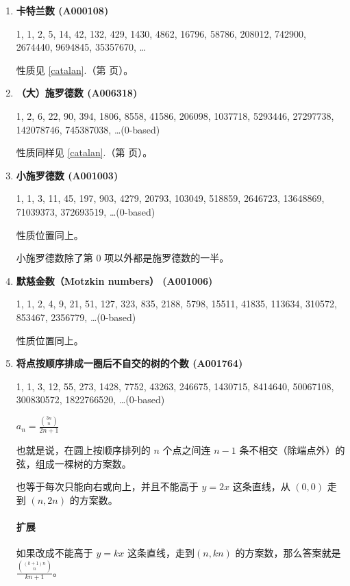 \documentclass[a4paper, twoside]{article}
\newcommand\detailedref[1]{\ref{#1}.\nameref{#1}（第 \pageref{#1} 页）}
\begin{document}
    \begin{enumerate}

        \item \textbf{卡特兰数 (A000108)}

        1, 1, 2, 5, 14, 42, 132, 429, 1430, 4862, 16796, 58786, 208012, 742900, 2674440, 9694845, 35357670, \dots

        性质见 \detailedref{catalan}。 

        \item \textbf{（大）施罗德数 (A006318)}

        1, 2, 6, 22, 90, 394, 1806, 8558, 41586, 206098, 1037718, 5293446, 27297738, 142078746, 745387038, \dots \;(0-based)

        性质同样见 \detailedref{catalan}。

        \item \textbf{小施罗德数 (A001003)}

        1, 1, 3, 11, 45, 197, 903, 4279, 20793, 103049, 518859, 2646723, 13648869, 71039373, 372693519, \dots \;(0-based)

        性质位置同上。

        小施罗德数除了第 $0$ 项以外都是施罗德数的一半。

        \item \textbf{默慈金数（Motzkin numbers） (A001006)}

        1, 1, 2, 4, 9, 21, 51, 127, 323, 835, 2188, 5798, 15511, 41835, 113634, 310572, 853467, 2356779, \dots \;(0-based)

        性质位置同上。

        \item \textbf{将点按顺序排成一圈后不自交的树的个数 (A001764)}

        1, 1, 3, 12, 55, 273, 1428, 7752, 43263, 246675, 1430715, 8414640, 50067108, 300830572, 1822766520, \dots \;(0-based)

        $ a_n = \frac {{3n \choose n}} {2n + 1} $

        也就是说，在圆上按顺序排列的 $n$ 个点之间连 $n - 1$ 条不相交（除端点外）的弦，组成一棵树的方案数。

        也等于每次只能向右或向上，并且不能高于 $y = 2x$ 这条直线，从 $(0, 0)$ 走到 $(n, 2n)$ 的方案数。

        \paragraph{扩展} 如果改成不能高于 $y = kx$ 这条直线，走到$(n, kn)$ 的方案数，那么答案就是$ \frac {{(k + 1)n \choose n}} {kn + 1} $。


\end{enumerate}
\end{document}
